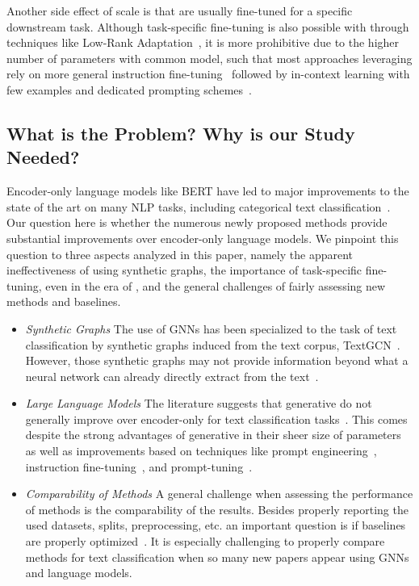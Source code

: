 Another side effect of scale is that \SLMs are usually fine-tuned for a specific downstream task. Although task-specific fine-tuning is also possible with \LLMs through techniques like Low-Rank Adaptation~\cite{lora}, it is more prohibitive due to the higher number of parameters with common model, such that most approaches leveraging \LLMs rely on more general instruction fine-tuning~\cite{ouyangTrainingLanguageModels2022} followed by in-context learning with few examples and dedicated prompting schemes~\cite{carp}.

\subsection{What is the Problem? Why is our Study Needed?}

Encoder-only language models like BERT have led to major improvements to the state of the art on many NLP tasks, including categorical text classification~\cite{galke2023really,galkescherp-acl2022}.
Our question here is whether the numerous newly proposed methods provide substantial improvements over encoder-only language models. 
We pinpoint this question to three aspects analyzed in this paper, namely the apparent ineffectiveness of using synthetic graphs, the importance of task-specific fine-tuning, even in the era of  \LLMs, and the general challenges of fairly assessing new methods and baselines.

\begin{itemize}
    \item  \textit{Synthetic Graphs}
The use of GNNs has been specialized to the task of text classification by synthetic graphs induced from the text corpus, \eg TextGCN~\cite{DBLP:conf/aaai/YaoM019}.
However, those synthetic graphs may not provide information beyond what a neural network can already directly extract from the text~\cite{galkescherp-acl2022}.

\item \textit{Large Language Models}
The literature suggests that generative \LLMs do not generally improve over encoder-only \SLM for text classification tasks~\cite{DBLP:journals/corr/abs-2402-07470-pushing-the-limit,
carp,
yuan2023revisiting,
li2023chatgpt,
yu2023open}.
This comes despite the strong advantages of generative \LLMs in their sheer size of parameters as well as improvements based on techniques like prompt engineering~\cite{carp,chain-of-thought}, 
instruction fine-tuning~\cite{wei2022finetuned}, and prompt-tuning~\cite{liu-etal-2022-p,lester-etal-2021-power}.

\item \textit{Comparability of Methods}
A general challenge when assessing the performance of methods is the comparability of the results.
Besides properly reporting the used datasets, splits, preprocessing, etc. an important question is if baselines are properly optimized~\cite{DBLP:conf/recsys/DacremaCJ19,leech2024questionablepracticesmachinelearning}. 
It is especially challenging to properly compare methods for text classification when so many new papers appear using GNNs and language models.
\end{itemize}

